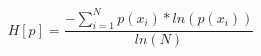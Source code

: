 \documentclass[a4paper, 12pt]{article}
\begin{document}
\begin{equation}
H[p] = \frac{- \sum_{i = 1}^{N} p(x_i) * ln(p(x_i))}{ln(N)}
\label{eq:shannon_entropy}
\end{equation}





\end{document}
